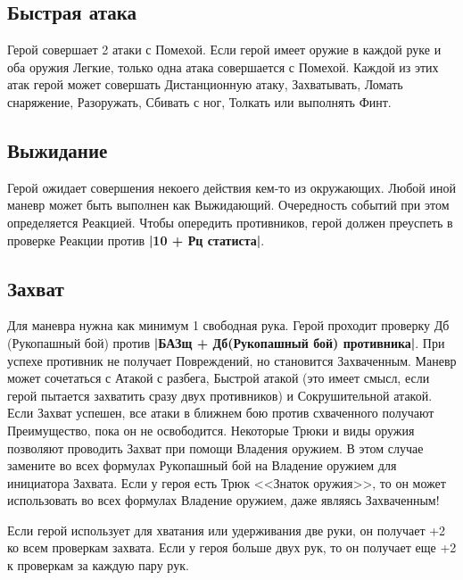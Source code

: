\subsection{Быстрая атака}
Герой совершает 2 атаки с Помехой. Если герой имеет оружие в каждой руке и оба оружия Легкие, только одна атака совершается с Помехой. Каждой из этих атак герой может совершать Дистанционную атаку, Захватывать, Ломать снаряжение, Разоружать, Сбивать с ног, Толкать или выполнять Финт.
\subsection{Выжидание}
Герой ожидает совершения некоего действия кем-то из окружающих. Любой иной маневр может быть выполнен как Выжидающий.
\newline
Очередность событий при этом определяется Реакцией. Чтобы
опередить противников, герой должен преуспеть в проверке
Реакции против \textbf{|10 + Рц статиста|}.
\subsection{Захват}
Для маневра нужна как минимум 1 свободная рука. Герой проходит проверку Дб (Рукопашный бой) против \textbf{|БАЗщ + Дб(Рукопашный бой) противника|}. При успехе противник не получает Повреждений, но становится Захваченным. Маневр может сочетаться с Атакой с разбега, Быстрой атакой (это имеет смысл, если герой пытается захватить сразу двух
противников) и Сокрушительной атакой. Если Захват успешен, все атаки в ближнем бою против схваченного получают Преимущество, пока он не освободится. Некоторые Трюки и виды оружия позволяют проводить Захват при помощи Владения оружием. В этом случае замените во всех формулах Рукопашный бой на Владение оружием для инициатора Захвата. Если у героя есть Трюк <<Знаток оружия>>, то он может использовать во всех формулах Владение оружием, даже являясь Захваченным!
\begin{tcolorbox}
Если герой использует для хватания или удерживания две руки, он получает +2 ко всем проверкам захвата. Если у героя больше двух рук, то он получает еще +2 к проверкам за каждую пару рук.
\end{tcolorbox}
